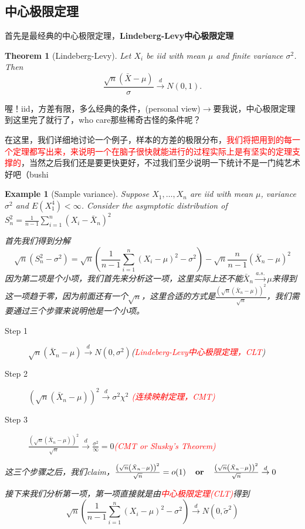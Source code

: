 \documentclass{article}
\newtheorem{theorem}{Theorem}[section]
\newtheorem{example}{Example}[section]
\begin{document}
\subsection{中心极限定理}
\par 首先是最经典的中心极限定理，\textbf{Lindeberg-Levy中心极限定理}
\begin{theorem}[Lindeberg-Levy]
	 Let $X_i$ be iid with mean $\mu$ and finite variance $\sigma^2$. Then
	$$
	\frac{\sqrt{n}(\bar{X}-\mu)}{\sigma} \stackrel{d}{\rightarrow} N(0,1) .
	$$
\end{theorem}
喔！iid，方差有限，多么经典的条件，(personal view)$\to$要我说，中心极限定理到这里完了就行了，who care那些稀奇古怪的条件呢？
\par 在这里，我们详细地讨论一个例子，样本的方差的极限分布，\textcolor{red}{我们将把用到的每一个定理都写出来，来说明一个在脑子很快就能进行的过程实际上是有坚实的定理支撑的}，当然之后我们还是要更快更好，不过我们至少说明一下统计不是一门纯艺术好吧（bushi
\begin{example}[Sample variance]
	 Suppose $X_1, \ldots, X_n$ are iid with mean $\mu$, variance $\sigma^2$ and $E\left(X_1^4\right)<\infty$. Consider the asymptotic distribution of $S_n^2=\frac{1}{n-1} \sum_{i=1}^n\left(X_i-\bar{X}_n\right)^2$\\
	 \par 首先我们得到分解
	 $$
	 \sqrt{n}\left(S_n^2-\sigma^2\right)=\sqrt{n}\left(\frac{1}{n-1} \sum_{i=1}^n\left(X_i-\mu\right)^2-\sigma^2\right)-\sqrt{n} \frac{n}{n-1}\left(\bar{X}_n-\mu\right)^2
	 $$
	 因为第二项是个小项，我们首先来分析这一项，这里实际上还不能$\bar{X}_n\stackrel{a.s.}{\rightarrow}\mu$来得到这一项趋于零，因为前面还有一个$\sqrt{n}$，这里合适的方式是$\frac{\left(\sqrt{n}\left(\bar{X}_n-\mu\right)\right)^2}{\sqrt{n}}$，我们需要通过三个步骤来说明他是一个小项。
	 \begin{description}
	 	\item[Step 1] $\sqrt{n}\left(\bar{X}_n-\mu\right)\stackrel{d}{\rightarrow}  N(0,\sigma^2)$(\textcolor{red}{Lindeberg-Levy中心极限定理，CLT})
	 	\item[Step 2] $\left(\sqrt{n}\left(\bar{X}_n-\mu\right)\right)^2\stackrel{d}{\rightarrow}\sigma^2\chi^2$ \textcolor{red}{(连续映射定理，CMT)}
	 	\item[Step 3] $\frac{\left(\sqrt{n}\left(\bar{X}_n-\mu\right)\right)^2}{\sqrt{n}}\stackrel{d}{\rightarrow}\frac{\sigma^2}{\infty}=0$\textcolor{red}{(CMT or Slusky's Theorem)}
	 \end{description}
 这三个步骤之后，我们claim，$\frac{\left(\sqrt{n}\left(\bar{X}_n-\mu\right)\right)^2}{\sqrt{n}}=o(1) \textbf{\quad or\quad} \frac{\left(\sqrt{n}\left(\bar{X}_n-\mu\right)\right)^2}{\sqrt{n}}\stackrel{d}{\rightarrow}0$
 \par 接下来我们分析第一项，第一项直接就是由\textcolor{red}{中心极限定理(CLT)}得到
 $$\sqrt{n}\left(\frac{1}{n-1} \sum_{i=1}^n\left(X_i-\mu\right)^2-\sigma^2\right)\stackrel{d}{\rightarrow}N(0,\widetilde{\sigma}^2)$$
\end{example}
\end{document}
